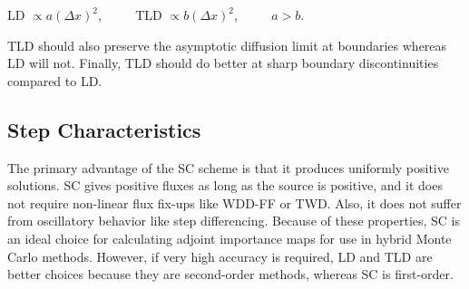 \documentclass[12pt]{article}
\begin{document}
\begin{center}
LD $\propto a(\Delta x)^2$, $\qquad$ TLD $\propto b(\Delta x)^2$, $\qquad$ $a>b$.
\end{center}

TLD should also preserve the asymptotic diffusion limit at boundaries whereas LD will not. Finally, TLD should do better at sharp boundary discontinuities compared to LD.

\subsection*{Step Characteristics}
\label{sec:step-characteristics}

The primary advantage of the SC scheme is that it produces uniformly positive
solutions. SC gives positive fluxes as long as the source is positive, and it
does not require non-linear flux fix-ups like WDD-FF or TWD.  Also, it does
not suffer from oscillatory behavior like step differencing.  Because of these
properties, SC is an ideal choice for calculating adjoint importance maps for
use in hybrid Monte Carlo methods.  However, if very high accuracy is
required, LD and TLD are better choices because they are second-order methods,
whereas SC is first-order.
\end{document}
